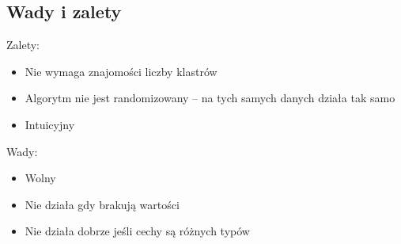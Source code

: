 \subsection{Wady i zalety}
Zalety:
\begin{itemize}
    \item Nie wymaga znajomości liczby klastrów
    \item Algorytm nie jest randomizowany -- na tych samych danych działa tak samo
    \item Intuicyjny
\end{itemize}
Wady:
\begin{itemize}
    \item Wolny
    \item Nie działa gdy brakują wartości
    \item Nie działa dobrze jeśli cechy są różnych typów
\end{itemize}